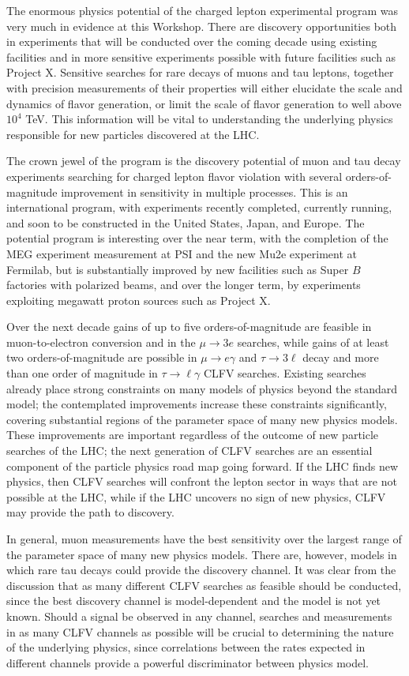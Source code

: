 The enormous physics potential of the charged
lepton experimental program was very much in evidence at this Workshop. There are discovery opportunities both in experiments that will be conducted over the coming decade using existing facilities and in more sensitive experiments possible with future facilities such as Project X.
Sensitive searches for rare decays of muons and tau leptons, together with precision measurements of their properties will either elucidate the scale and dynamics of flavor generation, or
limit the scale of flavor generation to well above $10^4$ TeV.  This information
will be vital to understanding the underlying physics responsible for new particles discovered at the LHC.

The crown jewel of the program is the discovery potential of muon and tau decay experiments searching for charged lepton flavor violation with several orders-of-magnitude improvement in sensitivity in
multiple processes.  This is an
international program, with experiments recently completed, currently running, and
soon to be constructed in the United States, Japan, and Europe.  The potential program is interesting over the near term, with the completion of the MEG experiment measurement at PSI and the new Mu2e experiment at Fermilab, but is substantially improved by new facilities such as Super $B$ factories with polarized beams, and over the longer term, by experiments exploiting megawatt proton sources such as Project X.

Over the next decade
gains of up to five orders-of-magnitude are feasible in
muon-to-electron conversion and in the $\mu \to 3 e$
searches, while gains of at least two orders-of-magnitude
are possible in $\mu \to e\gamma$ and $\tau \to 3\ell$ decay and more than one order of magnitude in $\tau \to \ell\gamma$ CLFV
searches.  Existing searches already place strong constraints on
many models of physics beyond the standard model; the contemplated improvements increase these constraints significantly, covering substantial regions of the parameter space of many new physics models.
These improvements are important regardless of the outcome of new particle searches of the
LHC; the next generation of CLFV searches are an essential
component of the particle physics road map going forward.  If the LHC finds new
physics, then CLFV searches will confront the lepton sector in ways
that are not possible at the LHC, while if the LHC uncovers no sign of
new physics, CLFV may provide the path to discovery.

In general, muon measurements have the best
sensitivity over the largest range of the parameter space of many new
physics models. There are, however, models
in which  rare tau decays could provide the discovery
channel. It was clear from the discussion that as many different
CLFV searches as feasible should be conducted, since the best discovery
channel is model-dependent and the model is not yet known.  Should a
signal be observed in any channel, searches and measurements in as
many CLFV channels as possible will be crucial to determining the nature
of the underlying physics, since correlations between the rates
expected in different channels provide a powerful discriminator between
physics model.

